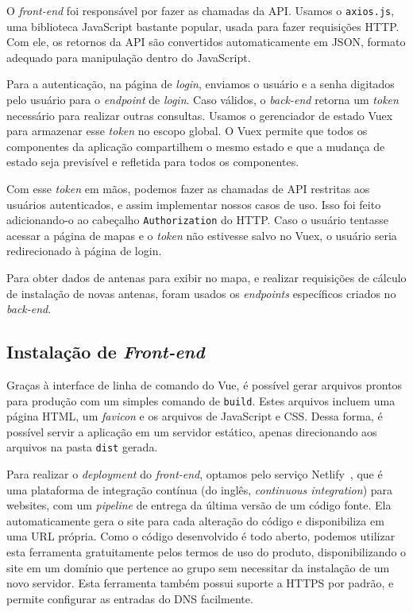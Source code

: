 \documentclass[]{politex}
\begin{document}
O \textit{front-end} foi responsável por fazer as chamadas da API. Usamos o
\texttt{axios.js}, uma biblioteca JavaScript bastante popular, usada para fazer
requisições HTTP. Com ele, os retornos da API são convertidos automaticamente em
JSON, formato adequado para manipulação dentro do JavaScript.

Para a autenticação, na página de \textit{login}, enviamos o usuário e a senha
digitados pelo usuário para o \textit{endpoint} de \textit{login}. Caso válidos,
o \textit{back-end} retorna um \textit{token} necessário para realizar outras
consultas. Usamos o gerenciador de estado Vuex para armazenar esse
\textit{token} no escopo global. O Vuex permite que todos os componentes da
aplicação compartilhem o mesmo estado e que a mudança de estado seja previsível
e refletida para todos os componentes.

Com esse \textit{token} em mãos, podemos fazer as chamadas de API restritas aos
usuários autenticados, e assim implementar nossos casos de uso. Isso foi feito
adicionando-o ao cabeçalho \texttt{Authorization} do HTTP. Caso o usuário
tentasse acessar a página de mapas e o \textit{token} não estivesse salvo no
Vuex, o usuário seria redirecionado à página de login.

Para obter dados de antenas para exibir no mapa, e realizar requisições de
cálculo de instalação de novas antenas, foram usados os \textit{endpoints}
específicos criados no \textit{back-end}.

\subsection{Instalação de \textit{Front-end}}

Graças à interface de linha de comando do Vue, é possível gerar arquivos prontos
para produção com um simples comando de \texttt{build}. Estes arquivos incluem
uma página HTML, um \textit{favicon} e os arquivos de JavaScript e CSS. Dessa
forma, é possível servir a aplicação em um servidor estático, apenas
direcionando aos arquivos na pasta \texttt{dist} gerada.

Para realizar o \textit{deployment} do \textit{front-end}, optamos pelo serviço
Netlify~\cite{netlify}, que é uma plataforma de integração contínua (do inglês,
\textit{continuous integration}) para websites, com um \textit{pipeline} de
entrega da última versão de um código fonte. Ela automaticamente gera o site
para cada alteração do código e disponibiliza em uma URL própria. Como o código
desenvolvido é todo aberto, podemos utilizar esta ferramenta gratuitamente pelos
termos de uso do produto, disponibilizando o site em um domínio que pertence ao
grupo sem necessitar da instalação de um novo servidor. Esta ferramenta também
possui suporte a HTTPS por padrão, e permite configurar as entradas do DNS
facilmente.
\end{document}
